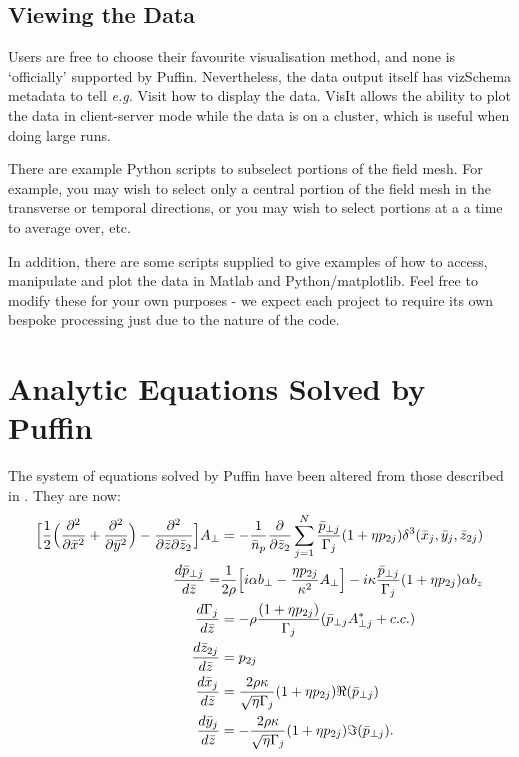 \documentclass[12pt]{article}%
\begin{document}
\subsection{Viewing the Data}

Users are free to choose their favourite visualisation method, and none is `officially' supported by Puffin. Nevertheless, the data output itself has vizSchema metadata to tell \textit{e.g.} Visit how to display the data. VisIt allows the ability to plot the data in client-server mode while the data is on a cluster, which is useful when doing large runs.

There are example Python scripts to subselect portions of the field mesh. For example, you may wish to select only a central portion of the field mesh in the transverse or temporal directions, or you may wish to select portions at a a time to average over, etc.

In addition, there are some scripts supplied to give examples of how to access, manipulate and plot the data in Matlab and Python/matplotlib. Feel free to modify these for your own purposes - we expect each project to require its own bespoke processing just due to the nature of the code.


\newpage

\section{Analytic Equations Solved by Puffin}

\label{puff-eqns}

The system of equations solved by Puffin have been altered from those described in \cite{puffin}. They are now:
\begin{align}
\Bigl[\frac{1}{2}\Bigl(\frac{\partial^2}{\partial\bar{x}^2} + \frac{\partial^2}{\partial\bar{y}^2}\Bigr) -  \frac{\partial^2}{\partial\bar{z}\partial\bar{z}_2}\Bigr]A_{\bot}  & = -\frac{1}{\bar{n}_p}\frac{\partial}{\partial \bar{z}_2}\sum_{j=1}^{N} \frac{\bar{p}_{\bot j}}{\Gamma_j} (1+\eta p_{2j})     \delta^3(\bar{x}_j,\bar{y}_j,\bar{z}_{2j})  \label{fieldeq2} \\
\frac{d \bar{p}_{\bot j}}{d \bar{z}} = & \frac{1}{2\rho}\Bigl[ i \alpha b_{\bot} - \frac{\eta p_{2j}}{\kappa^2}A_{\bot} \Bigr] - i\kappa \frac{ \bar{p}_{\bot j}}{\Gamma_j} (1 + \eta p_{2j})  \alpha b_z \label{pperpeqn2} \\
\frac{d \Gamma_{j}}{d \bar{z}} &= - \rho \frac{(1 + \eta p_{2j})}{\Gamma_j} (\bar{p}_{\bot j} A^*_{\bot j} + c.c.)  \label{gameqn} \\
\frac{d\bar{z}_{2j}}{d\bar{z}}& = p_{2j}  \label{z2eqgen2} \\
\frac{d\bar{x}_j}{d\bar{z}} &=  \frac{2 \rho \kappa}{\sqrt{\eta} \Gamma_j} (1 + \eta p_{2j}) \Re(\bar{p}_{\bot j}) \label{xeqgen2} \\
\frac{d\bar{y}_j}{d\bar{z}} &= - \frac{2 \rho \kappa}{\sqrt{\eta} \Gamma_j}  (1 + \eta p_{2j}) \Im(\bar{p}_{\bot j}). \label{yeqgen2}
\end{align}
\end{document}
